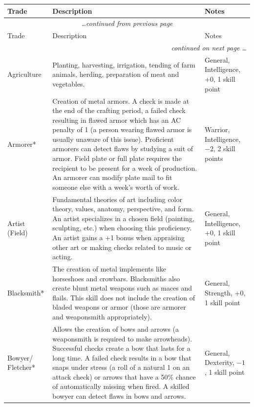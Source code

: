 \label{performskills}
\noindent
\begin{longtable}{|p{}|p{}|p{}|}
\hline
Trade	& Description	& Notes \\
\hline\hline
\endfirsthead
\multicolumn{3}{c}{\textit{\ldots continued from previous page}} \\
\hline
Trade	& Description	& Notes \\
\hline\hline
\endhead
\hline
\multicolumn{3}{r}{\textit{continued on next page \ldots}}\\
\endfoot
\endlastfoot
\rowcolor[gray]{.9}Agriculture	& Planting, harvesting, irrigation, tending of farm animals, herding, preparation of meat and vegetables.	& General, Intelligence, +0, 1 skill point \\
Armorer*	& Creation of metal armors.  A check is made at the end of the crafting period, a failed check resulting in flawed armor which has an AC penalty of 1 (a person wearing flawed armor is usually unaware of this issue).  Proficient armorers can detect flaws by studying a suit of armor.  Field plate or full plate requires the recipient to be present for a week of production.  An armorer can modify plate mail to fit someone else with a week's worth of work.	& Warrior, Intelligence, $-2$, 2 skill points \\
\rowcolor[gray]{.9}Artist (Field)	& Fundamental theories of art including color theory, values, anatomy, perspective, and form.  An artist specializes in a chosen field (painting, sculpting, etc.) when choosing this proficiency.  An artist gains a +1 bonus when appraising other art or making checks related to music or acting.	& General, Intelligence, +0, 1 skill point \\
Blacksmith*	& The creation of metal implements like horseshoes and crowbars.  Blacksmiths also create blunt metal weapons such as maces and flails.  This skill does not include the creation of bladed weapons or armor (those are armorer and weaponsmith appropriately).	& General, Strength, +0, 1 skill point \\
\rowcolor[gray]{.9}Bowyer/ Fletcher*	& Allows the creation of bows and arrows (a weaponsmith is required to make arrowheads).  Successful checks create a bow that lasts for a long time.  A failed check results in a bow that snaps under stress (a roll of a natural 1 on an attack check) or arrows that have a 50\% chance of automatically missing when fired.  A skilled bowyer can detect flaws in bows and arrows. 	& General, Dexterity, $-1$, 1 skill point \\

\end{longtable}
